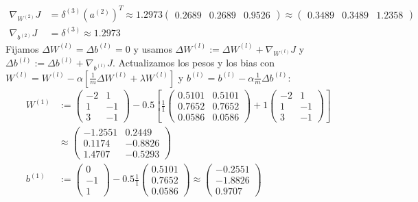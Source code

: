 \begin{enumerate}
\begin{align*}
\nabla_{W^{(2)}} J &= \delta^{(3)} (a^{(2)})^T \approx 1.2973 \begin{pmatrix} 0.2689 & 0.2689 & 0.9526 \end{pmatrix} \approx \begin{pmatrix} 0.3489 & 0.3489 & 1.2358 \end{pmatrix} \\
\nabla_{b^{(2)}} J &= \delta^{(3)} \approx 1.2973
\end{align*}
Fijamos $\Delta W^{(l)} = \Delta b^{(l)} = 0$ y usamos $\Delta W^{(l)} := \Delta W^{(l)} + \nabla_{W^{(l)}}J$ y $\Delta b^{(l)} := \Delta b^{(l)} + \nabla_{b^{(l)}}J$. Actualizamos los pesos y los bias con $W^{(l)} = W^{(l)} - \alpha \left[\frac{1}{m}\Delta W^{(l)} + \lambda W^{(l)}\right]$ y $b^{(l)} = b^{(l)} - \alpha \frac{1}{m}\Delta b^{(l)}$:
\begin{align*}
W^{(1)} &:= \begin{pmatrix} -2 & 1 \\ 1 & -1 \\ 3 & -1 \end{pmatrix} - 0.5 \left[\frac{1}{1} \begin{pmatrix} 0.5101 & 0.5101 \\ 0.7652 & 0.7652 \\ 0.0586 & 0.0586 \end{pmatrix} + 1 \begin{pmatrix} -2 & 1 \\ 1 & -1 \\ 3 & -1 \end{pmatrix}\right] \\
&\approx \begin{pmatrix} -1.2551 & 0.2449 \\ 0.1174 & -0.8826 \\ 1.4707 & -0.5293 \end{pmatrix} \\
b^{(1)} &:= \begin{pmatrix} 0 \\ -1 \\ 1 \end{pmatrix} - 0.5 \frac{1}{1} \begin{pmatrix} 0.5101 \\ 0.7652 \\ 0.0586 \end{pmatrix} \approx \begin{pmatrix} -0.2551 \\ -1.8826 \\ 0.9707 \end{pmatrix} \\

\end{align*}
\end{enumerate}
